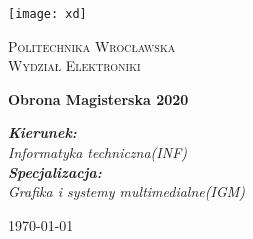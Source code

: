\begin{titlepage}
	\centering
	\texttt{[image: xd]}\par\vspace{1cm}
	{\scshape\LARGE Politechnika Wrocławska\\ Wydział Elektroniki \par}
	\vspace{2.5cm}
	{\huge\bfseries Obrona Magisterska 2020\par}
	\vspace{2cm}
	{\Large\itshape 
		\textbf{Kierunek:}\\Informatyka techniczna(INF)\\
		\textbf{Specjalizacja:}\\Grafika i systemy multimedialne(IGM)\\
		\par}
	
	
	\vfill
	
	{\large \today\par}
\end{titlepage}
